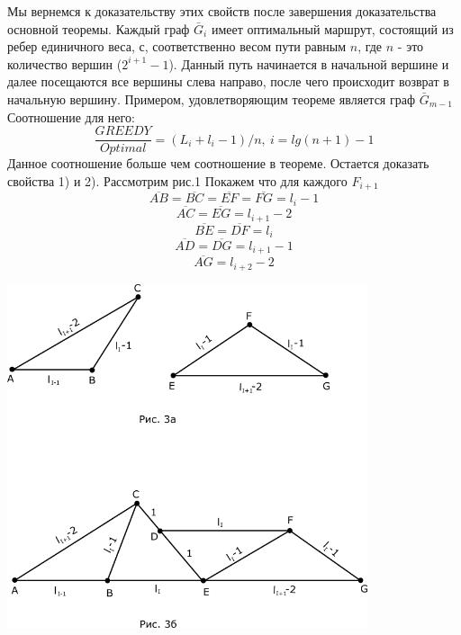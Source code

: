 \documentclass[a4paper, 14pt]{extarticle}
\begin{document}
Мы вернемся к доказательству этих свойств после завершения доказательства основной теоремы.
Каждый граф $\bar G_i$ имеет оптимальный маршрут, состоящий из ребер единичного веса, с, соответственно весом пути равным $n$, где $n$ - это количество вершин ($2^{i+1}-1$). Данный путь начинается в начальной вершине и далее посещаются все вершины слева направо, после чего происходит возврат в начальную вершину. Примером, удовлетворяющим теореме является граф $\bar G_{m-1}$ Соотношение для него:
\begin{equation}
\frac{GREEDY}{Optimal} = (L_i+l_i-1)/n, \:  i=lg(n+1)-1
\end{equation}
Данное соотношение больше чем соотношение в теореме.
Остается доказать свойства 1) и 2).
Рассмотрим рис.1
Покажем что для каждого $F_{i+1}$
\begin{equation}\label{2.13}
\overline {AB}= \overline {BC}= \overline {EF}=\overline {FG}=l_i-1
\end{equation}
\begin{equation}\label{2.14}
\overline {AC}= \overline {EG}=l_{i+1}-2
\end{equation}
\begin{equation}\label{2.15}
\overline {BE}= \overline {DF}=l_i
\end{equation}
\begin{equation}\label{2.16}
\overline {AD}= \overline {DG}=l_{i+1}-1
\end{equation}
\begin{equation}\label{2.17}
\overline {AG}=l_{i+2}-2
\end{equation}

\begin{center}
\includegraphics[width=300pt]{ris3.png}
\end{center}
\end{document}
